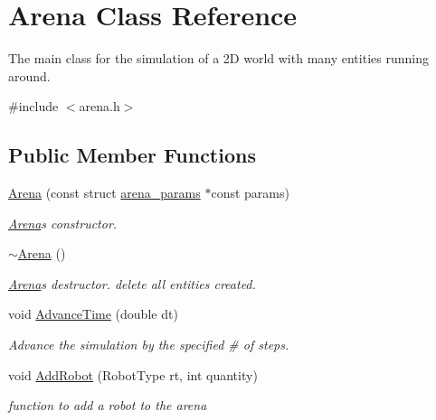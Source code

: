 \hypertarget{class_arena}{}\section{Arena Class Reference}
\label{class_arena}


The main class for the simulation of a 2D world with many entities running around.  




{\ttfamily \#include $<$arena.\+h$>$}

\subsection*{Public Member Functions}
\begin{DoxyCompactItemize}
\item 
\mbox{\hyperlink{class_arena_ac442d519facc5feebfd7612a53817e9a}{Arena}} (const struct \mbox{\hyperlink{structarena__params}{arena\+\_\+params}} $\ast$const params)
\begin{DoxyCompactList}\small\item\em \mbox{\hyperlink{class_arena}{Arena}}\textquotesingle{}s constructor. \end{DoxyCompactList}\item 
\mbox{\label{class_arena_ae21b399e9e3f6b8ac4ecc44d7d1667fc}} 
\mbox{\hyperlink{class_arena_ae21b399e9e3f6b8ac4ecc44d7d1667fc}{$\sim$\+Arena}} ()
\begin{DoxyCompactList}\small\item\em \mbox{\hyperlink{class_arena}{Arena}}\textquotesingle{}s destructor. {\ttfamily delete} all entities created. \end{DoxyCompactList}\item 
void \mbox{\hyperlink{class_arena_ad92d8b2e1593b652445e31d173977fc6}{Advance\+Time}} (double dt)
\begin{DoxyCompactList}\small\item\em Advance the simulation by the specified \# of steps. \end{DoxyCompactList}\item 
void \mbox{\hyperlink{class_arena_a0012b0774ae6642a1a559b97ca335c4b}{Add\+Robot}} (Robot\+Type rt, int quantity)
\begin{DoxyCompactList}\small\item\em function to add a robot to the arena \end{DoxyCompactList}\item 

\end{DoxyCompactItemize}
